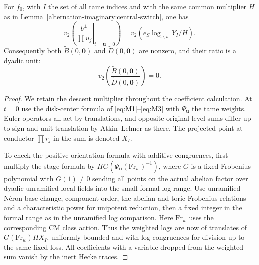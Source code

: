 \begin{lemma}\label{alternation-imaginary:mixed-coefficient}
For \(f_0\), with \(I\) the set of all tame indices and with the same common multiplier \(H\) as in Lemma~\ref{alternation-imaginary:central-switch}, one has
\[
             v_2\left(\left.\frac{b^\pm}{\prod u_j}\right|_{t=\mathbf u=0}\right)
                         =v_2(e_S\log_{\omega,w}Y_I/H).              \tag{I4}\label{eq:I4}
\]
Consequently both \(\widetilde B(0,\mathbf0)\) and
\(\widetilde D(0,\mathbf0)\) are nonzero, and their ratio is a dyadic
unit:
\[
 v_2\!\left(
 \frac{\widetilde B(0,\mathbf0)}{\widetilde D(0,\mathbf0)}
 \right)=0.
\]
\end{lemma}
\begin{proof}
We retain the descent multiplier throughout the coefficient calculation. At \(t=0\) use the disk-center formula of \eqref{eq:M1}--\eqref{eq:M3} with \(\Psi_{\mathbf u}\) the tame weights. Euler operators all act by translations, and opposite original-level sums differ up to sign and unit translation by Atkin--Lehner as there. The projected point at conductor \(\prod r_j\) in the sum is denoted \(X_I\).

To check the positive-orientation formula with additive congruences, first multiply the stage formula by \(H G(\Psi_{\mathbf u}(\mathrm{Fr}_w)^{-1})\), where \(G\) is a fixed Frobenius polynomial with \(G(1)\ne0\) sending all points on the actual abelian factor over dyadic unramified local fields into the small formal-log range. Use unramified Néron base change, component order, the abelian and toric Frobenius relations and a characteristic power for unipotent reduction, then a fixed integer in the formal range as in the unramified log comparison. Here \(\mathrm{Fr}_w\) uses the corresponding CM class action. Thus the weighted logs are now of translates of \(G(\mathrm{Fr}_w) H X_I\), uniformly bounded and with log congruences for division up to the same fixed loss. All coefficients with a variable dropped from the weighted sum vanish by the inert Hecke traces.


\end{proof}
